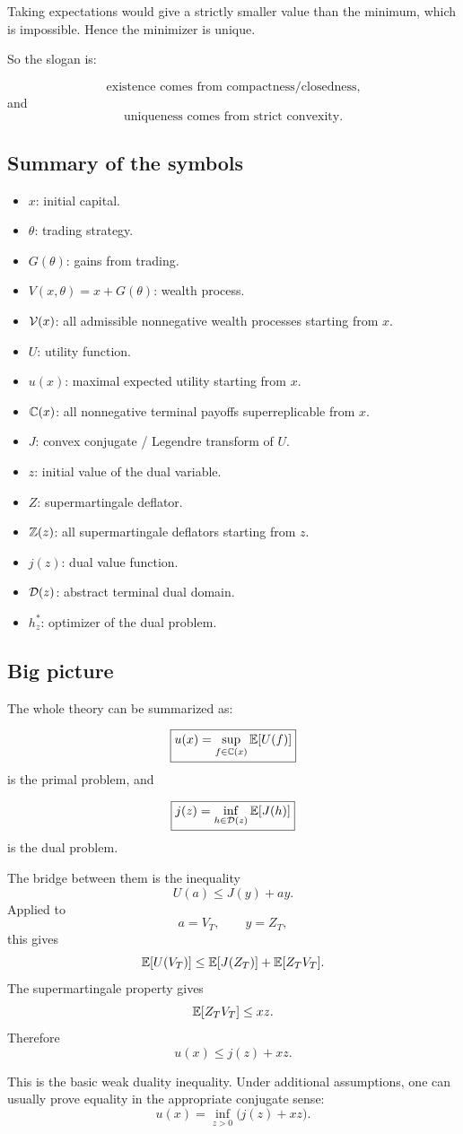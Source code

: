 Taking expectations would give a strictly smaller value than the minimum, which is impossible. Hence the minimizer is unique.

\begin{opomba}
So the slogan is:

\[
    \text{existence comes from compactness/closedness,}
\]
and
\[
    \text{uniqueness comes from strict convexity.}
\]
\end{opomba}

\subsection{Summary of the symbols}

\begin{itemize}
    \item $x$: initial capital.
    \item $\theta$: trading strategy.
    \item $G(\theta)$: gains from trading.
    \item $V(x,\theta)=x+G(\theta)$: wealth process.
    \item $\mathcal{V}(x)$: all admissible nonnegative wealth processes starting from $x$.
    \item $U$: utility function.
    \item $u(x)$: maximal expected utility starting from $x$.
    \item $\mathbb{C}(x)$: all nonnegative terminal payoffs superreplicable from $x$.
    \item $J$: convex conjugate / Legendre transform of $U$.
    \item $z$: initial value of the dual variable.
    \item $Z$: supermartingale deflator.
    \item $\mathbb{Z}(z)$: all supermartingale deflators starting from $z$.
    \item $j(z)$: dual value function.
    \item $\mathcal{D}(z)$: abstract terminal dual domain.
    \item $h_z^*$: optimizer of the dual problem.
\end{itemize}

\subsection{Big picture}

The whole theory can be summarized as:

\[
    \boxed{
    u(x)
    =
    \sup_{f\in\mathbb{C}(x)}
    \mathbb{E}[U(f)]
    }
\]
is the primal problem, and

\[
    \boxed{
    j(z)
    =
    \inf_{h\in\mathcal{D}(z)}
    \mathbb{E}[J(h)]
    }
\]
is the dual problem.

The bridge between them is the inequality
\[
    U(a)\leq J(y)+ay.
\]
Applied to
\[
    a=V_T,
    \qquad
    y=Z_T,
\]
this gives
\[
    \mathbb{E}[U(V_T)]
    \leq
    \mathbb{E}[J(Z_T)]
    +
    \mathbb{E}[Z_TV_T].
\]
The supermartingale property gives
\[
    \mathbb{E}[Z_TV_T]\leq xz.
\]
Therefore
\[
    u(x)\leq j(z)+xz.
\]

This is the basic weak duality inequality. Under additional assumptions, one can usually prove equality in the appropriate conjugate sense:
\[
    u(x)
    =
    \inf_{z>0}\bigl(j(z)+xz\bigr).
\]
